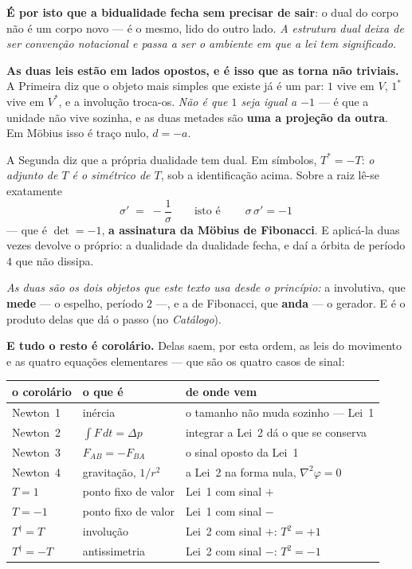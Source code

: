 \documentclass[livro.tex]{subfiles}
\begin{document}
\medskip
\noindent \textbf{É por isto que a bidualidade fecha sem precisar de sair}: o dual do corpo não é um
corpo novo --- é o mesmo, lido do outro lado. \emph{A estrutura dual deixa de ser convenção
notacional e passa a ser o ambiente em que a lei tem significado.}

\medskip
\noindent \textbf{As duas leis estão em lados opostos, e é isso que as torna não triviais.} A
Primeira diz que o objeto mais simples que existe já é um par: $1$ vive em $V$, $1^{*}$ vive em
$V^{*}$, e a involução troca-os. \emph{Não é que $1$ seja igual a $-1$} --- é que a unidade não vive
sozinha, e as duas metades são \textbf{uma a projeção da outra}. Em Möbius isso é traço nulo,
$d=-a$.

\medskip
\noindent A Segunda diz que a própria dualidade tem dual. Em símbolos, $T^{*}=-T$: \emph{o adjunto
de $T$ é o simétrico de $T$}, sob a identificação acima. Sobre a raiz lê-se exatamente
\[
  \sigma' \;=\; -\frac1\sigma
  \qquad\text{isto é}\qquad
  \boxed{\ \sigma\,\sigma' = -1\ }
\]
--- que é $\det=-1$, \textbf{a assinatura da Möbius de Fibonacci}. E aplicá-la duas vezes devolve o
próprio: a dualidade da dualidade fecha, e daí a órbita de período $4$ que não dissipa.

\medskip
\noindent \emph{As duas são os dois objetos que este texto usa desde o princípio:} a involutiva, que
\textbf{mede} --- o espelho, período $2$ ---, e a de Fibonacci, que \textbf{anda} --- o gerador. E é
o produto delas que dá o passo (no \emph{Catálogo}).

\medskip
\noindent \textbf{E tudo o resto é corolário.} Delas saem, por esta ordem, as leis do movimento e
as quatro equações elementares --- que são os quatro casos de sinal:

\begin{center}\small
\setlength\tabcolsep{4pt}
\begin{tabular}{@{}llp{}@{}}
\toprule
o corolário & o que é & de onde vem \\
\midrule
Newton~1 & inércia                & o tamanho não muda sozinho --- Lei~1 \\
Newton~2 & $\int\!F\,dt=\Delta p$ & integrar a Lei~2 dá o que se conserva \\
Newton~3 & $F_{AB}=-F_{BA}$       & o sinal oposto da Lei~1 \\
Newton~4 & gravitação, $1/r^{2}$  & a Lei~2 na forma nula, $\nabla^{2}\varphi=0$ \\
\midrule
$T=1$              & ponto fixo de valor & Lei~1 com sinal $+$ \\
$T=-1$             & ponto fixo de valor & Lei~1 com sinal $-$ \\
$T^{\dagger}=T$    & involução           & Lei~2 com sinal $+$: $T^{2}=+1$ \\
$T^{\dagger}=-T$   & antissimetria       & Lei~2 com sinal $-$: $T^{2}=-1$ \\
\bottomrule
\end{tabular}
\end{center}
\end{document}
